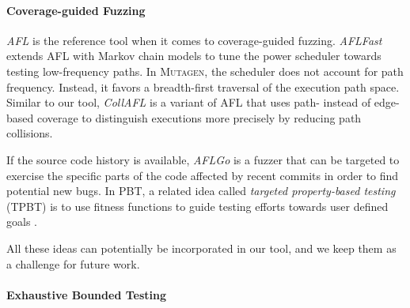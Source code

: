 \documentclass[sigconf, anonymous, review]{acmart}
\newcommand{\mutagen}{\textsc{Mutagen}\xspace}
\begin{document}
\paragraph{Coverage-guided Fuzzing}

\emph{AFL} \cite{afl} is the reference tool when it comes to coverage-guided
fuzzing.
%
\emph{AFLFast} \cite{bohme2017coverage} extends AFL with Markov chain models to
tune the power scheduler towards testing low-frequency paths.
%
In \mutagen, the scheduler does not account for path frequency.
%
Instead, it favors a breadth-first traversal of the execution path space.
%
Similar to our tool, \emph{CollAFL} \cite{gan2018collafl} is a variant of AFL
that uses path- instead of edge-based coverage to distinguish executions more
precisely by reducing path collisions.

If the source code history is available, \emph{AFLGo} \cite{bohme2017directed}
is a fuzzer that can be targeted to exercise the specific parts of the code
affected by recent commits in order to find potential new bugs.
%
In PBT, a related idea called \emph{targeted property-based testing} (TPBT) is
to use fitness functions to guide testing efforts towards user defined goals
\cite{loscher2017targeted, loscher2018automating}.



All these ideas can potentially be incorporated in our tool, and we keep them as
a challenge for future work.


\paragraph{Exhaustive Bounded Testing}
\end{document}
